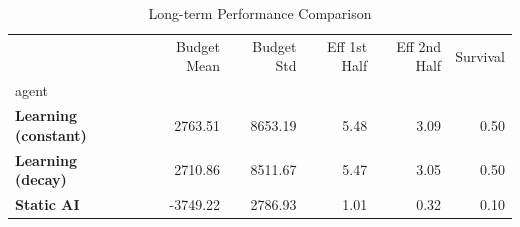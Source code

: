 \begin{table}
\caption{Long-term Performance Comparison}
\label{tab:long_term}
\begin{tabular}{lrrrrr}
\toprule
 & Budget Mean & Budget Std & Eff 1st Half & Eff 2nd Half & Survival \\
agent &  &  &  &  &  \\
\midrule
\textbf{Learning (constant)} & 2763.51 & 8653.19 & 5.48 & 3.09 & 0.50 \\
\textbf{Learning (decay)} & 2710.86 & 8511.67 & 5.47 & 3.05 & 0.50 \\
\textbf{Static AI} & -3749.22 & 2786.93 & 1.01 & 0.32 & 0.10 \\
\bottomrule
\end{tabular}
\end{table}
